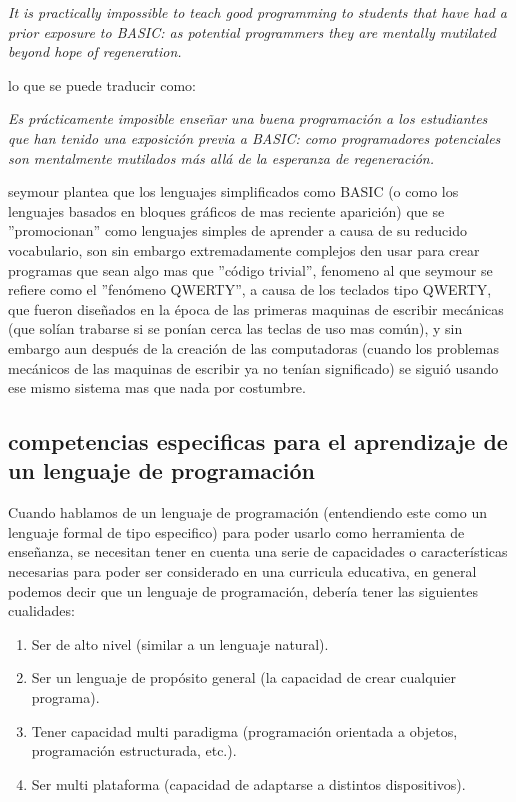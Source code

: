 \begin{center}
\textit{It is practically impossible to teach good programming to students that have had a prior exposure to BASIC: as potential programmers they are mentally mutilated beyond hope of regeneration.}
\end{center}

lo que se puede traducir como:

\begin{center}
\textit{Es prácticamente imposible enseñar una buena programación a los estudiantes que han tenido una exposición previa a BASIC: como programadores potenciales son mentalmente mutilados más allá de la esperanza de regeneración.}
\end{center}

seymour \cite{seymour_papert_desafio_1987} plantea que los lenguajes simplificados como BASIC (o como los lenguajes basados en bloques gráficos de mas reciente aparición) que se  ''promocionan'' como lenguajes simples de aprender a causa de su reducido vocabulario, son sin embargo extremadamente complejos den usar para crear programas que sean algo mas que ''código trivial'', fenomeno al que seymour \cite{seymour_papert_desafio_1987} se refiere como el ''fenómeno QWERTY'', a causa de los teclados tipo QWERTY, que fueron diseñados en la época de las primeras maquinas de escribir mecánicas (que solían trabarse si se ponían cerca las teclas de uso mas común), y sin embargo aun después de la creación de las computadoras (cuando los problemas mecánicos de las maquinas de escribir ya no tenían significado) se siguió usando ese mismo sistema mas que nada por costumbre.

\subsection{competencias especificas para el aprendizaje de un lenguaje de programación}

Cuando hablamos de un lenguaje de programación (entendiendo este como un lenguaje formal de tipo especifico) para poder usarlo como herramienta de enseñanza, se necesitan tener en cuenta una serie de capacidades o características necesarias para poder ser considerado en una curricula educativa, en general podemos decir que un lenguaje de programación, debería tener las siguientes cualidades:

\begin{enumerate}
   \item Ser de alto nivel (similar a un lenguaje natural).
   \item Ser un lenguaje de propósito general (la capacidad de crear cualquier programa).
   \item Tener capacidad multi paradigma (programación orientada a objetos, programación estructurada, etc.).
   \item Ser multi plataforma (capacidad de adaptarse a distintos dispositivos).
 \end{enumerate} 
 
